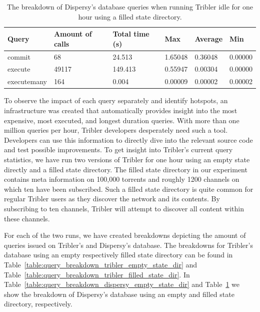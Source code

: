 \begin{table}[h]
	\centering
	\caption{The breakdown of Dispersy's database queries when running Tribler idle for one hour using a filled state directory.}
	\label{table:query_breakdown_dispersy_filled_state_dir}
	\begin{tabular}{|l|l|l|l|l|l|}
		\hline
		\textbf{Query} & \textbf{Amount of calls} & \textbf{Total time (s)} & \textbf{Max} & \textbf{Average} & \textbf{Min} \\ \hline
		commit   & 68   & 24.513   & 1.65048   & 0.36048   & 0.00000   \\ \hline
		execute   & 49117   & 149.413   & 0.55947   & 0.00304   & 0.00000   \\ \hline
		executemany   & 164   & 0.004   & 0.00009   & 0.00002   & 0.00002   \\ \hline
	\end{tabular}
\end{table}

To observe the impact of each query separately and identify hotspots, an infrastructure was created that automatically provides insight into the most expensive, most executed, and longest duration queries. 
With more than one million queries per hour, Tribler developers desperately need such a tool.
Developers can use this information to directly dive into the relevant source code and test possible improvements.
To get insight into Tribler's current query statistics, we have run two versions of Tribler for one hour using an empty state directly and a filled state directory.
The filled state directory in our experiment contains meta information on 100,000 torrents and roughly 1200 channels on which ten have been subscribed.
Such a filled state directory is quite common for regular Tribler users as they discover the network and its contents.
By subscribing to ten channels, Tribler will attempt to discover all content within these channels.

For each of the two runs, we have created breakdowns depicting the amount of queries issued on Tribler's and Dispersy's database.
The breakdowns for Tribler's database using an empty respectively filled state directory can be found in Table~\ref{table:query_breakdown_tribler_empty_state_dir} and Table~\ref{table:query_breakdown_tribler_filled_state_dir}.
In Table~\ref{table:query_breakdown_dispersy_empty_state_dir} and Table~\ref{table:query_breakdown_dispersy_filled_state_dir} we show the breakdown of Dispersy's database using an empty and filled state directory, respectively.


